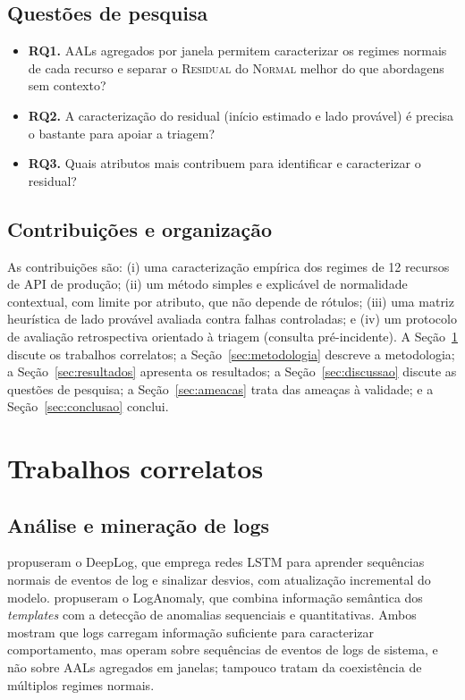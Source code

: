 \documentclass[sigconf,nonacm]{acmart}
\newcommand{\Normal}{\textsc{Normal}\xspace}
\newcommand{\Residual}{\textsc{Residual}\xspace}
\begin{document}
\subsection{Questões de pesquisa}
\begin{itemize}
  \item \textbf{RQ1.} AALs agregados por janela permitem caracterizar os regimes normais de cada recurso e separar o \Residual do \Normal melhor do que abordagens sem contexto?
  \item \textbf{RQ2.} A caracterização do residual (início estimado e lado provável) é precisa o bastante para apoiar a triagem?
  \item \textbf{RQ3.} Quais atributos mais contribuem para identificar e caracterizar o residual?
\end{itemize}

\subsection{Contribuições e organização}
As contribuições são: (i) uma caracterização empírica dos regimes de 12 recursos de API de produção; (ii) um método simples e explicável de normalidade contextual, com limite por atributo, que não depende de rótulos; (iii) uma matriz heurística de lado provável avaliada contra falhas controladas; e (iv) um protocolo de avaliação retrospectiva orientado à triagem (consulta pré-incidente). A Seção~\ref{sec:correlatos} discute os trabalhos correlatos; a Seção~\ref{sec:metodologia} descreve a metodologia; a Seção~\ref{sec:resultados} apresenta os resultados; a Seção~\ref{sec:discussao} discute as questões de pesquisa; a Seção~\ref{sec:ameacas} trata das ameaças à validade; e a Seção~\ref{sec:conclusao} conclui.

\section{Trabalhos correlatos}\label{sec:correlatos}

\subsection{Análise e mineração de logs}
\citet{du2017deeplog} propuseram o DeepLog, que emprega redes LSTM para aprender sequências normais de eventos de log e sinalizar desvios, com atualização incremental do modelo. \citet{meng2019loganomaly} propuseram o LogAnomaly, que combina informação semântica dos \emph{templates} com a detecção de anomalias sequenciais e quantitativas. Ambos mostram que logs carregam informação suficiente para caracterizar comportamento, mas operam sobre sequências de eventos de logs de sistema, e não sobre AALs agregados em janelas; tampouco tratam da coexistência de múltiplos regimes normais.
\end{document}
